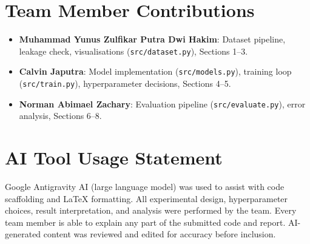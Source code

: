 \documentclass[conference]{IEEEtran}
\begin{document}
\appendix

\section{Team Member Contributions}

\begin{itemize}
  \item \textbf{Muhammad Yunus Zulfikar Putra Dwi Hakim}: Dataset
        pipeline, leakage check, visualisations (\texttt{src/dataset.py}),
        Sections 1--3.
  \item \textbf{Calvin Japutra}: Model implementation
        (\texttt{src/models.py}), training loop (\texttt{src/train.py}),
        hyperparameter decisions, Sections 4--5.
  \item \textbf{Norman Abimael Zachary}: Evaluation pipeline
        (\texttt{src/evaluate.py}), error analysis, Sections 6--8.
\end{itemize}

\section{AI Tool Usage Statement}

Google Antigravity AI (large language model) was used to assist with
code scaffolding and LaTeX formatting. All experimental design,
hyperparameter choices, result interpretation, and analysis were
performed by the team. Every team member is able to explain any part
of the submitted code and report. AI-generated content was reviewed
and edited for accuracy before inclusion.
\end{document}
